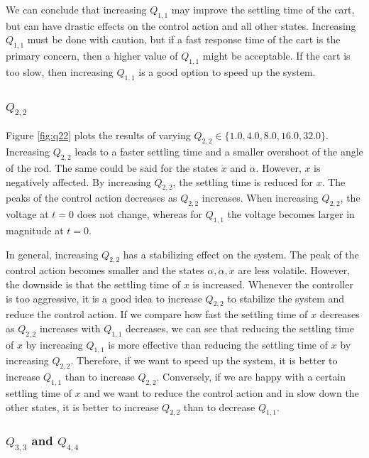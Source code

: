 \documentclass[a4paper,10pt]{article}
\theoremstyle{bluehomework}
\numberwithin{equation}{section}
\begin{document}
We can conclude that increasing $Q_{1,1}$ may improve the settling time of the cart, but can have drastic effects on the control action and all other states. Increasing $Q_{1,1}$ must be done with caution, but if a fast response time of the cart is the primary concern, then a higher value of $Q_{1,1}$ might be acceptable. If the cart is too slow, then increasing $Q_{1,1}$ is a good option to speed up the system.


\subsubsection{$Q_{2,2}$}

Figure \ref{fig:q22} plots the results of varying $Q_{2,2} \in \{1.0, 4.0, 8.0, 16.0, 32.0\}$. Increasing $Q_{2,2}$ leads to a faster settling time and a smaller overshoot of the angle of the rod. The same could be said for the states $\dot{x}$ and $\dot{\alpha}$. However, $x$ is negatively affected. By increasing $Q_{2,2}$, the settling time is reduced for $x$. The peaks of the control action decreases as $Q_{2,2}$ increases. When increasing $Q_{2,2}$, the voltage at $t = 0$ does not change, whereas for $Q_{1,1}$ the voltage becomes larger in magnitude at $t = 0$.
\medskip

In general, increasing $Q_{2,2}$ has a stabilizing effect on the system. The peak of the control action becomes smaller and the states $\alpha, \dot{\alpha}, \dot{x}$ are less volatile. However, the downside is that the settling time of $x$ is increased. Whenever the controller is too aggressive, it is a good idea to increase $Q_{2,2}$ to stabilize the system and reduce the control action. If we compare how fast the settling time of $x$ decreases as $Q_{2,2}$ increases with $Q_{1,1}$ decreases, we can see that reducing the settling time of $x$ by increasing $Q_{1,1}$ is more effective than reducing the settling time of $x$ by increasing $Q_{2,2}$. Therefore, if we want to speed up the system, it is better to increase $Q_{1,1}$ than to increase $Q_{2,2}$. Conversely, if we are happy with a certain settling time of $x$ and we want to reduce the control action and in slow down the other states, it is better to increase $Q_{2,2}$ than to decrease $Q_{1,1}$.

\subsubsection{$Q_{3,3}$ and $Q_{4,4}$}
\end{document}
